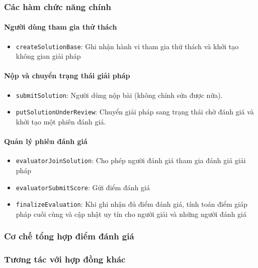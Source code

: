 \subsubsection{Các hàm chức năng chính}

\paragraph{Người dùng tham gia thử thách}

\begin{itemize}
  \item \texttt{createSolutionBase}: Ghi nhận hành vi tham gia thử thách và khởi tạo không gian giải pháp
\end{itemize}

\paragraph{Nộp và chuyển trạng thái giải pháp}

\begin{itemize}
  \item \texttt{submitSolution}: Người dùng nộp bài (không chỉnh sửa được nữa).
  \item \texttt{putSolutionUnderReview}: Chuyển giải pháp sang trạng thái chờ đánh giá và khởi tạo một phiên đánh giá.
\end{itemize}

\paragraph{Quản lý phiên đánh giá}

\begin{itemize}
  \item \texttt{evaluatorJoinSolution}: Cho phép người đánh giá tham gia đánh giá giải pháp
  \item \texttt{evaluatorSubmitScore}: Gửi điểm đánh giá
  \item \texttt{finalizeEvaluation}: Khi ghi nhận đủ điểm đánh giá, tính toán điểm giáp pháp cuối cùng và cập nhật uy tín cho người giải và những người đánh giá
\end{itemize}

\subsubsection{Cơ chế tổng hợp điểm đánh giá}

\subsubsection{Tương tác với hợp đồng khác}

